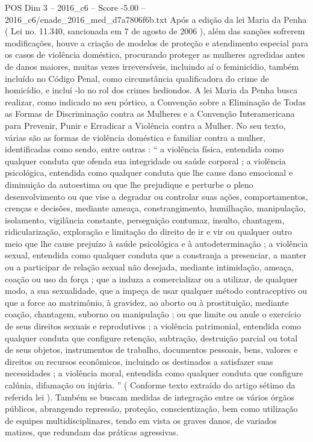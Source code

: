 \begin{textsample}{POS Dim 3 – 2016\_c6 – Score -5.00 – 2016\_c6/enade\_2016\_med\_d7a7806f6b.txt}
Após a edição da lei Maria da Penha ( Lei no. 11.340, sancionada em 7 de agosto de 2006 ), além das sanções sofrerem modificações, houve a criação de modelos de proteção e atendimento especial para os casos de violência doméstica, procurando proteger as mulheres agredidas antes de danos maiores, muitas vezes irreversíveis, incluindo aí o feminicídio, também incluído no Código Penal, como circunstância qualificadora do crime de homicídio, e incluí -lo no rol dos crimes hediondos.
A lei Maria da Penha busca realizar, como indicado no seu pórtico, a Convenção sobre a Eliminação de Todas as Formas de Discriminação contra as Mulheres e a Convenção Interamericana para Prevenir, Punir e Erradicar a Violência contra a Mulher.
No seu texto, várias são as formas de violência doméstica e familiar contra a mulher, identificadas como sendo, entre outras : “ a violência física, entendida como qualquer conduta que ofenda sua integridade ou saúde corporal ; a violência psicológica, entendida como qualquer conduta que lhe cause dano emocional e diminuição da autoestima ou que lhe prejudique e perturbe o pleno desenvolvimento ou que vise a degradar ou controlar suas ações, comportamentos, crenças e decisões, mediante ameaça, constrangimento, humilhação, manipulação, isolamento, vigilância constante, perseguição contumaz, insulto, chantagem, ridicularização, exploração e limitação do direito de ir e vir ou qualquer outro meio que lhe cause prejuízo à saúde psicológica e à autodeterminação ; a violência sexual, entendida como qualquer conduta que a constranja a presenciar, a manter ou a participar de relação sexual não desejada, mediante intimidação, ameaça, coação ou uso da força ; que a induza a comercializar ou a utilizar, de qualquer modo, a sua sexualidade, que a impeça de usar qualquer método contraceptivo ou que a force ao matrimônio, à gravidez, ao aborto ou à prostituição, mediante coação, chantagem, suborno ou manipulação ; ou que limite ou anule o exercício de seus direitos sexuais e reprodutivos ; a violência patrimonial, entendida como qualquer conduta que configure retenção, subtração, destruição parcial ou total de seus objetos, instrumentos de trabalho, documentos pessoais, bens, valores e direitos ou recursos econômicos, incluindo os destinados a satisfazer suas necessidades ; a violência moral, entendida como qualquer conduta que configure calúnia, difamação ou injúria. ” ( Conforme texto extraído do artigo sétimo da referida lei ).
Também se buscam medidas de integração entre os vários órgãos públicos, abrangendo repressão, proteção, conscientização, bem como utilização de equipes multidisciplinares, tendo em vista os graves danos, de variados matizes, que redundam das práticas agressivas.

\end{textsample}
